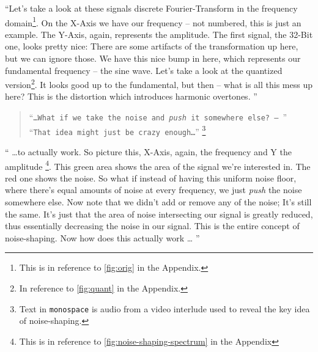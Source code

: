\asterism

\enquote{Let's take a look at these signals discrete Fourier-Transform in the frequency domain\footnote{This is in reference to \autoref{fig:orig} in the Appendix.}.
    On the X-Axis we have our frequency -- not numbered, this is just an example.
    The Y-Axis, again, represents the amplitude.
    The first signal, the 32-Bit one, looks pretty nice:
    There are some artifacts of the transformation up here, but we can ignore those.
    We have this nice bump in here, which represents our fundamental frequency -- the sine wave.
    Let's take a look at the quantized version\footnote{In reference to \autoref{fig:quant} in the Appendix.}.
    It looks good up to the fundamental, but then -- what is all this mess up here?
    This is the distortion which introduces harmonic overtones.
}

\asterism

\vspace{8pt}
\begin{verse}
    \enquote{\texttt{\ldots What if we take the noise and \textit{push} it somewhere else? --- }}\\
    \enquote{\texttt{That idea might just be crazy enough\ldots}} \footnote{
        Text in \texttt{monospace} is audio from a video interlude used to reveal the key idea of noise-shaping.}\\
\end{verse}
\enquote{%
    \ldots to actually work.
    So picture this, X-Axis, again, the frequency and Y the amplitude \footnote{This is in reference to \autoref{fig:noise-shaping-spectrum} in the Appendix}.
    This green area shows the area of the signal we're interested in.
    The red one shows the noise.
    So what if instead of having this uniform noise floor, where there's equal amounts of noise at every frequency, we just \textit{push} the noise somewhere else.
    Now note that we didn't add or remove any of the noise; It's still the same.
    It's just that the area of noise intersecting our signal is greatly reduced, thus essentially decreasing the noise in our signal.
    This is the entire concept of noise-shaping.
    Now how does this actually work \ldots
}
